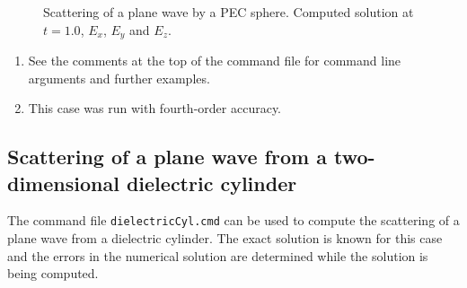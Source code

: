 \documentclass{article}
\begin{document}
{
\begin{figure}[hbt]
\newcommand{\figWidth}{5.5cm}
\newcommand{\trimfig}[2]{\trimFig{#1}{#2}{0.1}{0.05}{.05}{.05}}
\begin{center}
\end{center}
\caption{Scattering of a plane wave by a PEC sphere. Computed solution at $t=1.0$, $E_x$, $E_y$ and $E_z$.}
\label{fig:cyl2dScat}
\end{figure}
}

\begin{enumerate}
  \item See the comments at the top of the command file for command line arguments and further examples.
  \item This case was run with fourth-order accuracy.
\end{enumerate}



\clearpage
\subsection{Scattering of a plane wave from a two-dimensional dielectric cylinder} \label{sec:cyl2dDielectricScat}

The command file {\tt dielectricCyl.cmd} can be used to compute the scattering
of a plane wave from a dielectric cylinder. The exact solution is known for this case
and the errors in the numerical solution are determined while the solution
is being computed.

\end{document}
